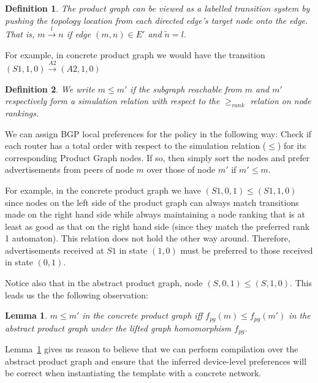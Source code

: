 \documentclass{sig-alternate-10pt}
\newcommand{\KW}[1]{\texttt{\small\bfseries{#1}}}
\newtheorem{defn}{Definition}
\newtheorem{lem}[thm]{Lemma}
\begin{document}
\begin{defn}
The product graph can be viewed as a labelled transition system by pushing the topology location from each directed edge's target node onto the edge. That is, $m\overset{l}{\rightarrow}n$ if edge $(m,n) \in E'$ and $\tilde{n} = l$. 
\end{defn}

For example, in concrete product graph we would have the transition $(S1,1,0)\overset{A2}{\rightarrow}(A2,1,0)$

\begin{defn}
We write $m \leq m'$ if the subgraph reachable from $m$ and $m'$ respectively form a simulation relation with respect to the $\geq_{rank}$ relation on node rankings.
\end{defn}

We can assign BGP local preferences for the policy in the following way: Check if each router has a total order with respect to the simulation relation ($\leq$) for its corresponding Product Graph nodes. If so, then simply sort the nodes and prefer advertisements from peers of node $m$ over those of node $m'$ if $m' \leq m$.
 
For example, in the concrete product graph we have $(S1,0,1) \leq (S1,1,0)$ since nodes on the left side of the product graph can always match transitions made on the right hand side while always maintaining a node ranking that is at least as good as that on the right hand side (since they match the preferred rank 1 automaton). This relation does not hold the other way around. Therefore, advertisements received at $S1$ in state $(1,0)$ must be preferred to those received in state $(0,1)$. 

Notice also that in the abstract product graph, node $(S,0,1) \leq (S,1,0)$. This leads us the the following observation:

\begin{lem}
\label{lem:preference}
$m \leq m'$ in the concrete product graph iff $f_{pg}(m) \leq f_{pg}(m')$ in the abstract product graph under the lifted graph homomorphism $f_{pg}$.
\end{lem}

Lemma~\ref{lem:preference} gives us reason to believe that we can perform compilation over the abstract product graph and ensure that the inferred device-level preferences will be correct when instantiating the template with a concrete network.


\newcommand{\highlight}[1]{%
  \colorbox{red!50}{$\displaystyle#1$}}
\newcommand{\Router}[1]{\KW{Router} #1:}
\newcommand{\REGEX}[1]{\texttt{regex}(#1)}
\newcommand{\PEER}{\texttt{peer}}
\newcommand{\PREFIX}{\texttt{prefix}}
\newcommand{\IF}{\texttt{if}}
\newcommand{\THEN}{\texttt{then}}
\newcommand{\COMM}{\texttt{comm}}
\newcommand{\MED}{\texttt{MED}}
\newcommand{\Arrow}{\ensuremath{\leftarrow}}
\end{document}
